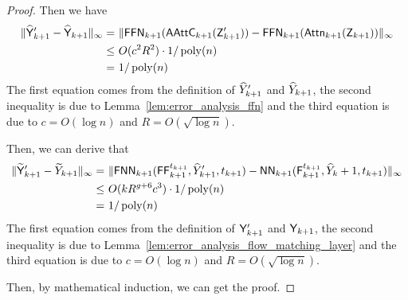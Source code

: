 \begin{proof}
    Then we have
    \begin{align*}
        \| \widehat{\mathsf{Y}}'_{k+1} - \widehat{\mathsf{Y}}_{k+1}\|_\infty =&~ \|\mathsf{FFN}_{k+1}(\mathsf{AAttC}_{k+1}(\mathsf{Z}'_{k+1})) - \mathsf{FFN}_{k+1}(\mathsf{Attn}_{k+1}(\mathsf{Z}_{k+1}))\|_\infty\\
        \leq&~ O(c^2 R^2) \cdot 1/\operatorname{poly}(n)\\
        = &~ 1/\operatorname{poly}(n)
    \end{align*}
   The first equation comes from the definition of $\widehat{Y}'_{k+1}$ and $\widehat{Y}_{k+1}$, the second inequality is due to Lemma~\ref{lem:error_analysis_ffn} and the third equation is due to $c = O(\log n)$ and $R = O(\sqrt{\log n})$.

    Then, we can derive that
    \begin{align*}
        \| \widetilde{\mathsf{Y}}'_{k+1} - \widetilde{Y}_{k+1}\|_\infty =&~ \| \mathsf{FNN}_{k+1}(\mathsf{FF}^{t_{k+1}}_{k+1},\widehat{Y}'_{k+1},t_{k+1})  - \mathsf{NN}_{k+1}(\mathsf{F}^{t_{k+1}}_{k+1},\widehat{Y}_k+1,t_{k+1}) \|_\infty\\
        \leq &~ O(kR^{g+6}c^3) \cdot 1/\operatorname{poly}(n)\\
        =&~ 1/\operatorname{poly}(n)
    \end{align*}
    The first equation comes from the definition of $\mathsf{Y}'_{k+1} $ and $ \mathsf{Y}_{k+1}$, the second inequality is due to Lemma~\ref{lem:error_analysis_flow_matching_layer} and the third equation is due to $c = O(\log n)$ and $R = O(\sqrt{\log n})$.

    Then, by mathematical induction, we can get the proof.
\end{proof}